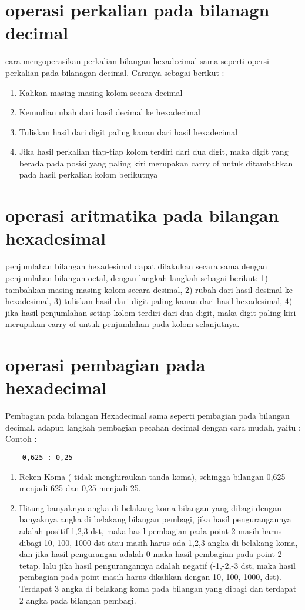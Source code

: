 \documentclass{article}
\begin{document}
\section{operasi perkalian pada bilanagn decimal}
cara mengoperasikan perkalian bilangan hexadecimal sama seperti opersi perkalian pada bilanagan decimal. Caranya sebagai berikut :
	\begin{enumerate}
		\item Kalikan masing-masing kolom secara decimal
		\item Kemudian ubah dari hasil decimal ke hexadecimal
		\item Tuliskan hasil dari digit paling kanan dari hasil hexadecimal
		\item Jika hasil perkalian tiap-tiap kolom terdiri dari dua digit, maka digit yang berada pada posisi yang paling kiri merupakan carry of untuk ditambahkan pada hasil perkalian kolom berikutnya
	\end{enumerate}
\section{operasi aritmatika pada bilangan hexadesimal}
penjumlahan bilangan hexadesimal dapat dilakukan secara sama dengan penjumlahan bilangan octal, dengan langkah-langkah sebagai berikut: 1) tambahkan masing-masing kolom secara desimal, 2) rubah dari hasil desimal ke hexadesimal, 3) tuliskan hasil dari digit paling kanan dari hasil hexadesimal, 4) jika hasil penjumlahan setiap kolom terdiri dari dua digit, maka digit paling kiri merupakan carry of untuk penjumlahan pada kolom selanjutnya.


\section {operasi pembagian pada hexadecimal}
Pembagian pada bilangan Hexadecimal sama seperti pembagian pada bilangan decimal. adapun langkah pembagian pecahan decimal dengan cara mudah, yaitu :
	Contoh : 
	\begin{verbatim}
	0,625 : 0,25
	\end{verbatim}
	\begin{enumerate}
	\item Reken Koma ( tidak menghiraukan tanda koma), sehingga bilangan 0,625 menjadi 625 dan 0,25 menjadi 25.
	\item Hitung banyaknya angka di belakang koma bilangan yang dibagi dengan banyaknya angka di belakang bilangan pembagi, jika hasil pengurangannya adalah positif 1,2,3 dst, maka hasil pembagian pada point 2 masih harus dibagi 10, 100, 1000 dst atau masih harus ada 1,2,3 angka di belakang koma, dan jika hasil pengurangan adalah 0 maka hasil pembagian pada point 2 tetap. lalu jika hasil pengurangannya adalah negatif (-1,-2,-3 dst, maka hasil pembagian pada point masih harus dikalikan dengan 10, 100, 1000, dst). Terdapat 3 angka di belakang koma pada bilangan yang dibagi dan terdapat 2 angka pada bilangan pembagi. 
	\end{enumerate}
\end{document}

